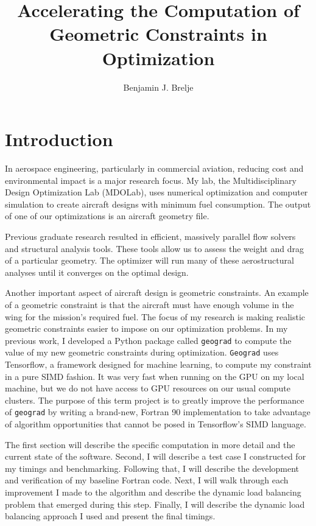 \documentclass[11pt,letterpaper]{article}
\title{Accelerating the Computation of Geometric Constraints in Optimization}
\author{Benjamin J. Brelje}
\begin{document}
\maketitle

\section{Introduction}
\qquad In aerospace engineering, particularly in commercial aviation, reducing cost and environmental impact is a major research focus.
My lab, the Multidisciplinary Design Optimization Lab (MDOLab), uses numerical optimization and computer simulation to create aircraft designs with minimum fuel consumption.
The output of one of our optimizations is an aircraft geometry file.

\qquad Previous graduate research resulted in efficient, massively parallel flow solvers and structural analysis tools.
These tools allow us to assess the weight and drag of a particular geometry.
The optimizer will run many of these aerostructural analyses until it converges on the optimal design.

\qquad Another important aspect of aircraft design is geometric constraints.
An example of a geometric constraint is that the aircraft must have enough volume in the wing for the mission's required fuel.
The focus of my research is making realistic geometric constraints easier to impose on our optimization problems.
In my previous work, I developed a Python package called \texttt{geograd} to compute the value of my new geometric constraints during optimization.
\texttt{Geograd} uses Tensorflow, a framework designed for machine learning, to compute my constraint in a pure SIMD fashion.
It was very fast when running on the GPU on my local machine, but we do not have access to GPU resources on our usual compute clusters.
The purpose of this term project is to greatly improve the performance of \texttt{geograd} by writing a brand-new, Fortran 90 implementation to take advantage of algorithm opportunities that cannot be posed in Tensorflow's SIMD language.

\qquad The first section will describe the specific computation in more detail and the current state of the software.
Second, I will describe a test case I constructed for my timings and benchmarking.
Following that, I will describe the development and verification of my baseline Fortran code.
Next, I will walk through each improvement I made to the algorithm and describe the dynamic load balancing problem that emerged during this step.
Finally, I will describe the dynamic load balancing approach I used and present the final timings.
\end{document}

